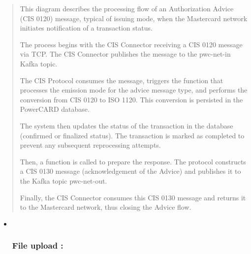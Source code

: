 \documentclass[12pt,a4paper]{report}
\begin{document}
\begin{quote}
This diagram describes the processing flow of an Authorization Advice
(CIS 0120) message, typical of issuing mode, when the Mastercard network
initiates notification of a transaction status.

The process begins with the CIS Connector receiving a CIS 0120 message
via TCP. The CIS Connector publishes the message to the pwc-net-in Kafka
topic.

The CIS Protocol consumes the message, triggers the function that
processes the emission mode for the advice message type, and performs
the conversion from CIS 0120 to ISO 1120. This conversion is persisted
in the PowerCARD database.

The system then updates the status of the transaction in the database
(confirmed or finalized status). The transaction is marked as completed
to prevent any subsequent reprocessing attempts.

Then, a function is called to prepare the response. The protocol
constructs a CIS 0130 message (acknowledgement of the Advice) and
publishes it to the Kafka topic pwc-net-out.

Finally, the CIS Connector consumes this CIS 0130 message and returns it
to the Mastercard network, thus closing the Advice flow.
\end{quote}

\begin{itemize}
\item ~
  \hypertarget{file-upload}{%
  \subsubsection{\texorpdfstring{\textbf{File upload
  :}}{File upload :}}\label{file-upload}}
\end{itemize}
\end{document}
